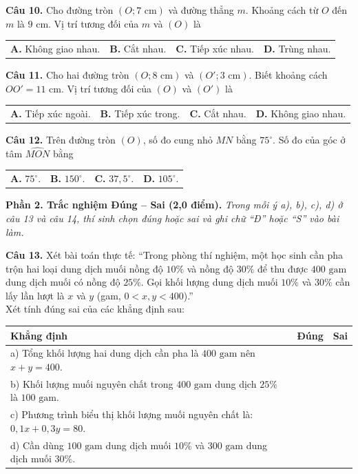 \documentclass[11pt,a4paper]{article}
\begin{document}
\vspace{1.5mm}
\textbf{Câu 10.} Cho đường tròn $(O; 7\text{ cm})$ và đường thẳng $m$. Khoảng cách từ $O$ đến $m$ là $9\text{ cm}$. Vị trí tương đối của $m$ và $(O)$ là\\
\begin{tabularx}{\linewidth}{XXXX}
\textbf{A.} Không giao nhau. & \textbf{B.} Cắt nhau. & \textbf{C.} Tiếp xúc nhau. & \textbf{D.} Trùng nhau.
\end{tabularx}

\vspace{1.5mm}
\textbf{Câu 11.} Cho hai đường tròn $(O; 8\text{ cm})$ và $(O'; 3\text{ cm})$. Biết khoảng cách $OO' = 11\text{ cm}$. Vị trí tương đối của $(O)$ và $(O')$ là\\
\begin{tabularx}{\linewidth}{XXXX}
\textbf{A.} Tiếp xúc ngoài. & \textbf{B.} Tiếp xúc trong. & \textbf{C.} Cắt nhau. & \textbf{D.} Không giao nhau.
\end{tabularx}

\vspace{1.5mm}
\textbf{Câu 12.} Trên đường tròn $(O)$, số đo cung nhỏ $MN$ bằng $75^\circ$. Số đo của góc ở tâm $\widehat{MON}$ bằng\\
\begin{tabularx}{\linewidth}{XXXX}
\textbf{A.} $75^\circ$. & \textbf{B.} $150^\circ$. & \textbf{C.} $37{,}5^\circ$. & \textbf{D.} $105^\circ$.
\end{tabularx}

\vspace{3mm}
\noindent
\textbf{Phần 2. Trắc nghiệm Đúng -- Sai (2,0 điểm).} \textit{Trong mỗi ý a), b), c), d) ở câu 13 và câu 14, thí sinh chọn đúng hoặc sai và ghi chữ ``Đ'' hoặc ``S'' vào bài làm.}

\vspace{1.5mm}
\textbf{Câu 13.} Xét bài toán thực tế: ``Trong phòng thí nghiệm, một học sinh cần pha trộn hai loại dung dịch muối nồng độ $10\%$ và nồng độ $30\%$ để thu được $400\text{ gam}$ dung dịch muối có nồng độ $25\%$. Gọi khối lượng dung dịch muối $10\%$ và $30\%$ cần lấy lần lượt là $x$ và $y$ (gam, $0 < x, y < 400$).''\\
Xét tính đúng sai của các khẳng định sau:
\begin{center}
\begin{tabularx}{\linewidth}{|X|c|c|}
\hline
\textbf{Khẳng định} & \textbf{Đúng} & \textbf{Sai} \\
\hline
a) Tổng khối lượng hai dung dịch cần pha là $400\text{ gam}$ nên $x + y = 400$. & & \\
\hline
b) Khối lượng muối nguyên chất trong $400\text{ gam}$ dung dịch $25\%$ là $100\text{ gam}$. & & \\
\hline
c) Phương trình biểu thị khối lượng muối nguyên chất là: $0{,}1x + 0{,}3y = 80$. & & \\
\hline
d) Cần dùng $100\text{ gam}$ dung dịch muối $10\%$ và $300\text{ gam}$ dung dịch muối $30\%$. & & \\
\hline
\end{tabularx}
\end{center}
\end{document}
